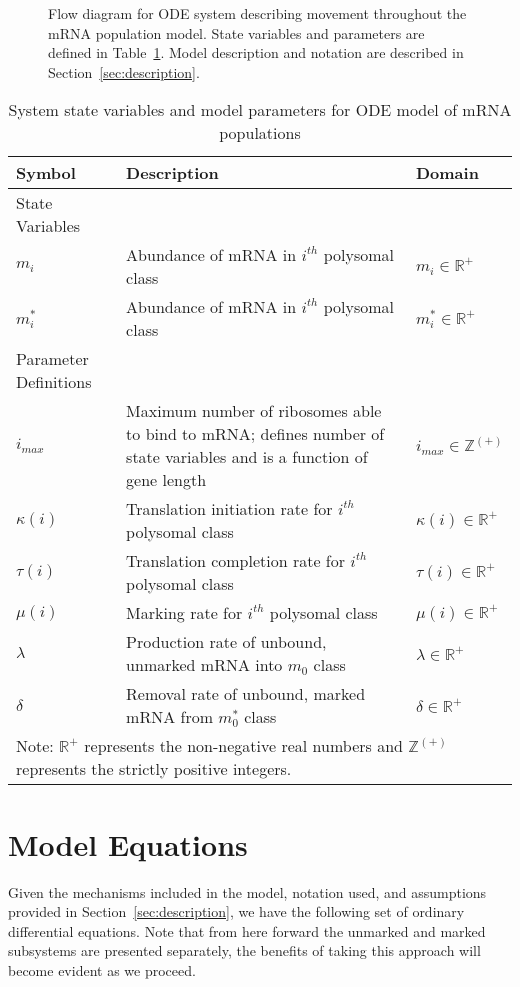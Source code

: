 \documentclass[review]{elsarticle}
\begin{document}
\begin{figure} [htbp]
\begin{framed}
\begin{tikzpicture}[every node/.style={rectangle,fill=white,node distance=16ex, scale=0.75}, scale=0.90]
	\end{tikzpicture}
	\caption{Flow diagram for ODE system describing movement throughout the mRNA population model. State variables and parameters are defined in Table~\ref{tab:params}.  Model description and notation are described in Section~\ref{sec:description}.}
	\label{fig:flow_diagram}
	\end{framed}
\end{figure}

\begin{table}
\centering
\begin{tabular}{|p{100pt} p{250pt} p{100pt}|}\hline
\textbf{Symbol}&\textbf{Description}&\textbf{Domain}\\ \hline\hline
State Variables & &\\ \hline
$m_i$ & Abundance of mRNA in $i^{th}$ polysomal class & $m_i\in\mathbb{R}^+$\\
$m_i^*$ & Abundance of mRNA in $i^{th}$ polysomal class & $m_i^*\in\mathbb{R}^+$\\ \hline
Parameter Definitions & &\\ \hline
$i_{max}$ & Maximum number of ribosomes able to bind to mRNA; defines number of state variables and is a function of gene length & $i_{max}\in\mathbb{Z}^{(+)}$\\
$\kappa(i)$ & Translation initiation rate for $i^{th}$ polysomal class &$\kappa(i)\in\mathbb{R}^+$\\
$\tau(i)$ & Translation completion rate for $i^{th}$ polysomal class &$\tau(i)\in\mathbb{R}^+$\\
$\mu(i)$ & Marking rate for $i^{th}$ polysomal class&$\mu(i)\in\mathbb{R}^+$\\
$\lambda$ & Production rate of unbound, unmarked mRNA into $m_0$ class&$\lambda\in\mathbb{R}^+$\\
$\delta$ & Removal rate of unbound, marked mRNA from $m_0^*$ class&$\delta\in\mathbb{R}^+$\\ \hline \hline
\multicolumn{3}{|p{450pt}|}{\footnotesize Note: $\mathbb{R}^+$ represents the non-negative real numbers and $\mathbb{Z}^{(+)}$ represents the strictly positive integers.} \\ \hline
\end{tabular}
\caption{System state variables and model parameters for ODE model of mRNA populations}
\label{tab:params}
\end{table}

\section{Model Equations}
Given the mechanisms included in the model, notation used, and assumptions provided in Section~\ref{sec:description}, we have the following set of ordinary differential equations. Note that from here forward the unmarked and marked subsystems are presented separately, the benefits of taking this approach will become evident as we proceed.  
\end{document}

